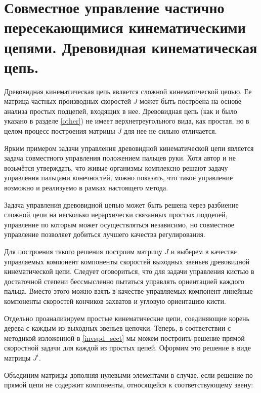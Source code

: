 \section{Совместное управление частично пересекающимися кинематическими цепями. Древовидная кинематическая цепь.}

Древовидная кинематическая цепь является сложной кинематической цепью. Ее матрица частных производных скоростей $J$ может быть построена на основе анализа простых подцепей, входящих в нее. Древовидная цепь (как и было указано в разделе \ref{other}) не имеет верхнетреугольного вида, как простая, но в целом процесс построения матрицы $J$ для нее не сильно отличается.

Ярким примером задачи управления древовидной кинематической цепи является задача совместного управления положением пальцев руки. Хотя автор и не возьмётся утверждать, что живые организмы комплексно решают задачу управления пальцами конечностей, можно показать, что такое управление возможно и реализуемо в рамках настоящего метода.

Задача управления древовидной цепью может быть решена через разбиение сложной цепи на несколько иерархически связанных простых подцепей, управление по которым может осуществляться независимо, но совместное управление позволяет добиться лучшего качества регулирования.

Для построения такого решения построим матрицу $J$ и выберем в качестве управляемых компонент компоненты скоростей выходных звеньев древовидной кинематической цепи. Следует оговориться, что для задачи управления кистью в достаточной степени бессмысленно пытаться управлять ориентацией каждого пальца. Вместо этого можно взять в качестве управляемых компонент линейные компоненты скоростей кончиков захватов и угловую ориентацию кисти. 

Отдельно проанализируем простые кинематические цепи, соединяющие корень дерева с каждым из выходных звеньев цепочки. Теперь, в соответствии с методикой изложенной в \ref{invspd_sect} мы можем построить решение прямой скоростной задачи для каждой из простых цепей. Оформим это решение в виде матрицы \textbf{$J^i$}.

Объединим матрицы дополняя нулевыми элементами в случае, если решение по прямой цепи не содержит компоненты, относящейся к соответствующему звену:

